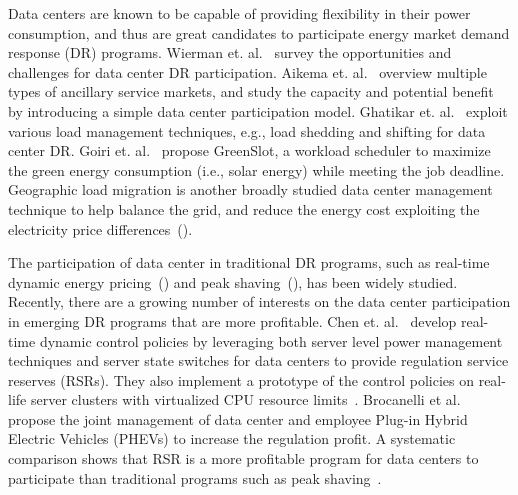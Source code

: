 Data centers are known to be capable of providing flexibility in their power consumption, and thus are great candidates to participate energy market demand response (DR) programs. Wierman et. al.~\cite{WiermanIGCC} survey the opportunities and challenges for data center DR participation. Aikema et. al.~\cite{aikema2012data} overview multiple types of ancillary service markets, and study the capacity and potential benefit by introducing a simple data center participation model. Ghatikar et. al.~\cite{ghatikar2012demand} exploit various load management techniques, e.g., load shedding and shifting for data center DR. Goiri et. al.~\cite{goiri2015matching} propose GreenSlot, a workload scheduler to maximize the green energy consumption (i.e., solar energy) while meeting the job deadline. Geographic load migration is another broadly studied data center management technique to help balance the grid, and reduce the energy cost exploiting the electricity price differences~(\cite{wangexploring,wang2013data,chiu2012electric,liu2011greening,lin2012online}). 

The participation of data center in traditional DR programs, such as real-time dynamic energy pricing~(\cite{wang2013sequential,ghamkhari2012data,liu2014pricing}) and peak shaving~(\cite{urgaonkar2011optimal,PSUSigmetrics12,aksanli2013architecting}), has been widely studied. Recently, there are a growing number of interests on the data center participation in emerging DR programs that are more profitable. Chen et. al.~\cite{chenASPDAC} develop real-time dynamic control policies by leveraging both server level power management techniques and server state switches for data centers to provide regulation service reserves (RSRs). They also implement a prototype of the control policies on real-life server clusters with virtualized CPU resource limits~\cite{chendynamic}. Brocanelli et al.~\cite{brocanelli2013joint} propose the joint management of data center and employee Plug-in Hybrid Electric Vehicles (PHEVs) to increase the regulation profit. A systematic comparison shows that RSR is a more profitable program for data centers to participate than traditional programs such as peak shaving~\cite{chenIGCC}. 


